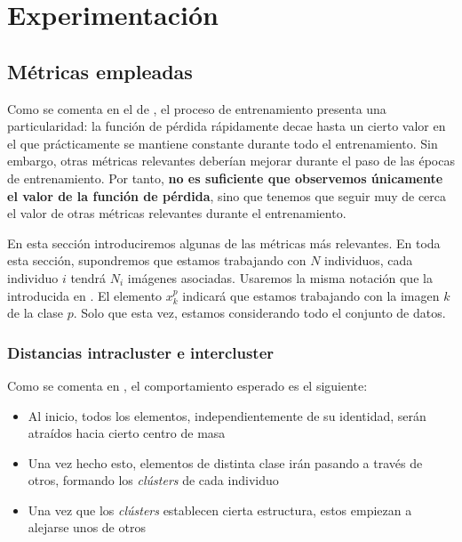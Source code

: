 \chapter{Experimentación} \label{ich:Experimentación}

\section{Métricas empleadas} \label{isec:metricas_teoria}

Como se comenta en el  de \cite{informatica:principal}, el proceso de entrenamiento presenta una particularidad: la función de pérdida rápidamente decae hasta un cierto valor en el que prácticamente se mantiene constante durante todo el entrenamiento. Sin embargo, otras métricas relevantes deberían mejorar durante el paso de las épocas de entrenamiento. Por tanto, \textbf{no es suficiente que observemos únicamente el valor de la función de pérdida}, sino que tenemos que seguir muy de cerca el valor de otras métricas relevantes durante el entrenamiento.

En esta sección introduciremos algunas de las métricas más relevantes. En toda esta sección, supondremos que estamos trabajando con $N$ individuos, cada individuo $i$ tendrá $N_i$ imágenes asociadas. Usaremos la misma notación que la introducida en . El elemento $x_k^p$ indicará que estamos trabajando con la imagen $k$ de la clase $p$. Solo que esta vez, estamos considerando todo el conjunto de datos.


\subsection{Distancias intracluster e intercluster} \label{isubs:teoria_distancia_intra_inter_cluster}

Como se comenta en \cite{informatica:paper_cacd}, el comportamiento esperado es el siguiente:

\begin{itemize}
    \item Al inicio, todos los elementos, independientemente de su identidad, serán atraídos hacia cierto centro de masa
    \item Una vez hecho esto, elementos de distinta clase irán pasando a través de otros, formando los \textit{clústers} de cada individuo
    \item Una vez que los \textit{clústers} establecen cierta estructura, estos empiezan a alejarse unos de otros
\end{itemize}\

